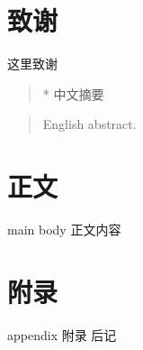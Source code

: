 \documentclass[degree=undergraduate,bibstyle=numerical,font=empty]{xmuthesis}
\begin{document}
\maketitle
\chapter*{致谢}
这里致谢
\begin{abstract}*
    中文摘要
\end{abstract}
\begin{abstract}
    English abstract. 
\end{abstract}
\xmutableofcontents %
\chapter{正文}{main body}
正文内容
\nocite{*} 

\appendix
\chapter{附录}{appendix}
附录
\backmatter
后记
\end{document}
